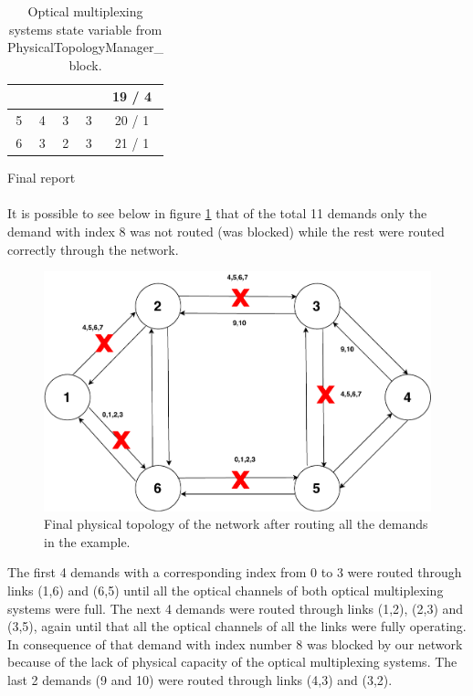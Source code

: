 \begin{table}[H]
\begin{tabular}{|c|c|c|c|c|}
		&                    &                    &                                                                          & 19 / 4                                                                       \\ \hline
		5                  & 4                  & 3                  & 3                                                                        & 20 / 1                                                                       \\ \hline
		6                  & 3                  & 2                  & 3                                                                        & 21 / 1                                                                       \\ \hline
	\end{tabular}
	\caption{Optical multiplexing systems state variable from PhysicalTopologyManager\_  block.}
	\label{OMS_example}
\end{table}

\Large Final report\\ \\

\normalsize It is possible to see below in figure \ref{routing_result} that of the total 11 demands only the demand with index 8 was not routed (was blocked) while the rest were routed correctly through the network.

\begin{figure}[H]
\centering
\includegraphics[width=15cm]{sdf/heuristic/transparent/figures/routingResultExample}
\caption{Final physical topology of the network after routing all the demands in the example.}
\label{routing_result}
\end{figure}

The first 4 demands with a corresponding index from 0 to 3 were routed through links (1,6) and (6,5) until all the optical channels of both optical multiplexing systems were full. The next 4 demands were routed through links (1,2), (2,3) and (3,5), again until that all the optical channels of all the links were fully operating. In consequence of that demand with index number 8 was blocked by our network because of the lack of physical capacity of the optical multiplexing systems. The last 2 demands (9 and 10) were routed through links (4,3) and (3,2). 


